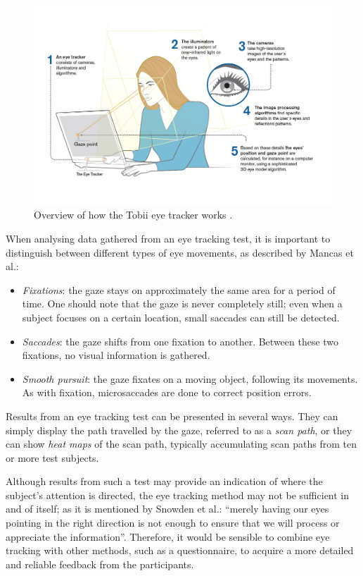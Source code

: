 \begin{figure}[h!]
	\centering
	\includegraphics[width=\textwidth]{figures/tobii.jpg}
	\caption{Overview of how the Tobii eye tracker works \cite{TobiiPro}.\label{fig:tobii}}
\end{figure}

When analysing data gathered from an eye tracking test, it is important to distinguish between different types of eye movements, as described by Mancas et al.:

\begin{itemize}
\item \textit{Fixations}: the gaze stays on approximately the same area for a period of time. One should note that the gaze is never completely still; even when a subject focuses on a certain location, small saccades can still be detected.
\item \textit{Saccades}: the gaze shifts from one fixation to another. Between these two fixations, no visual information is gathered.
\item \textit{Smooth pursuit}: the gaze fixates on a moving object, following its movements. As with fixation, microsaccades are done to correct position errors.
\end{itemize}

Results from an eye tracking test can be presented in several ways. They can simply display the path travelled by the gaze, referred to as a \textit{scan path}, or they can show \textit{heat maps} of the scan path, typically accumulating scan paths from ten or more test subjects. 

Although results from such a test may provide an indication of where the subject’s attention is directed, the eye tracking method may not be sufficient in and of itself; as it is mentioned by Snowden et al.\cite{snowden2012basic}: “merely having our eyes pointing in the right direction is not enough to ensure that we will process or appreciate the information”. Therefore, it would be sensible to combine eye tracking with other methods, such as a questionnaire, to acquire a more detailed and reliable feedback from the participants.


